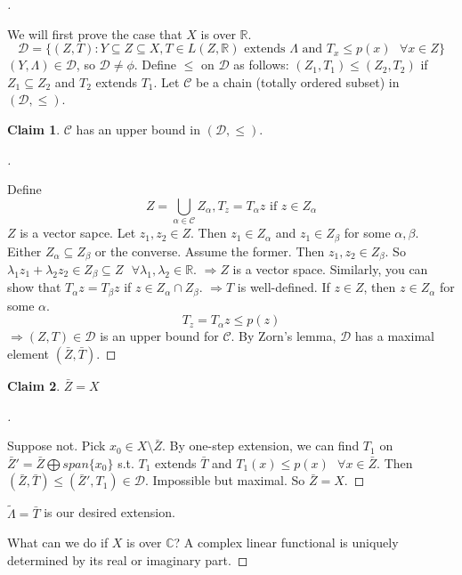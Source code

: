 \documentclass{article}
\newcommand{\sfa}{\text{  } \forall}
\theoremstyle{definition}
\newtheorem*{clm}{Claim}
\newenvironment{proofs}[1][\proofname]{%
  \begin{proof}[#1]$ $\par\nobreak\ignorespaces
}{%
  \end{proof}
}
\begin{document}
\begin{proofs}
	We will first prove the case that $X$ is over $\mathbb{R}$.
	\[
		\mathcal{D} = \{ (Z, T): Y \subseteq Z \subseteq X, T \in L(Z, \mathbb{R}) \text{ extends } \Lambda \text{ and } T_x \leq p(x) \sfa x \in Z \}
	\]
	$(Y, \Lambda) \in \mathcal{D}$, so $\mathcal{D} \neq \phi$.
	Define $\leq$ on $\mathcal{D}$ as follows:
	$(Z_1, T_1) \leq (Z_2, T_2)$ if $Z_1 \subseteq Z_2$ and $T_2$ extends $T_1$.
	Let $\mathcal{C}$ be a chain (totally ordered subset) in $(\mathcal{D}, \leq)$.
	\begin{clm}
		$\mathcal{C}$ has an upper bound in $(\mathcal{D}, \leq)$.
	\end{clm}

	\begin{proofs}
		Define 
		\[
			Z = \bigcup_{\alpha \in \mathcal{C}} Z_\alpha, T_z = T_\alpha z \text{ if } z \in Z_\alpha
		\]
		$Z$ is a vector sapce.
		Let $z_1, z_2 \in Z$. 
		Then $z_1 \in Z_\alpha$ and $z_1 \in Z_\beta$ for some $\alpha, \beta$. 
		Either $Z_\alpha \subseteq Z_\beta$ or the converse.
		Assume the former.
		Then $z_1, z_2 \in Z_\beta$.
		So $\lambda_1 z_1 + \lambda_2 z_2 \in Z_\beta \subseteq Z \sfa \lambda_1, \lambda_2 \in \mathbb{R}$.
		$\Rightarrow Z$ is a vector space.
		Similarly, you can show that $T_\alpha z = T_\beta z$ if $z \in Z_\alpha \cap Z_\beta$. 
		$\Rightarrow T$ is well-defined.
		If $z \in Z$, then $z \in Z_\alpha$ for some $\alpha$.
		\[
			T_z = T_\alpha z \leq p(z)
		\]
		$\Rightarrow (Z, T) \in \mathcal{D}$ is an upper bound for $\mathcal{C}$.
		By Zorn's lemma, $\mathcal{D}$ has a maximal element $(\bar{Z}, \bar{T})$.
		
	\end{proofs}
	
		\begin{clm}
			$\bar{Z} = X$
		\end{clm}

		\begin{proofs}
			Suppose not.
			Pick $x_0 \in X \setminus \bar{Z}$.
			By one-step extension, we can find $T_1$ on $\bar{Z}' = \bar{Z} \bigoplus  span\{x_0\}$ s.t. $T_1$ extends $\bar{T}$ and $T_1(x) \leq p(x) \sfa x \in \bar{Z}$.
			Then $(\bar{Z}, \bar{T}) \leq (\bar{Z}', T_1) \in \mathcal{D}$.
			Impossible but maximal.
			So $\bar{Z} = X$.
		\end{proofs}
		$\tilde{\Lambda} = \bar{T}$ is our desired extension.
		\par What can we do if $X$ is over $\mathbb{C}$?
		A complex linear functional is uniquely determined by its real or imaginary part. 
		

\end{proofs}
\end{document}
